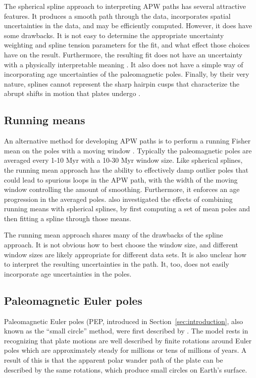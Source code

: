 \documentclass[preprint,12pt,authoryear]{elsarticle}
\begin{document}
The spherical spline approach to interpreting APW paths has several attractive features.
It produces a smooth path through the data, incorporates spatial uncertainties
in the data, and may be efficiently computed.
However, it does have some drawbacks.
It is not easy to determine the appropriate uncertainty weighting and spline
tension parameters for the fit, and what effect those choices have on the result.
Furthermore, the resulting fit does not have an uncertainty with a physically
interpretable meaning \citep{torsvik1996continental}.
It also does not have a simple way of incorporating age uncertainties of the paleomagnetic poles.
Finally, by their very nature, splines cannot represent the sharp hairpin cusps
that characterize the abrupt shifts in motion that plates undergo \citep{irving1972hairpins, gordon1984paleomagnetic}.

\subsection{Running means}

An alternative method for developing APW paths is to perform a running Fisher
mean on the poles with a moving window \citep{van2001evidence, torsvik2008global}.
Typically the paleomagnetic poles are averaged every 1-10 Myr with a 10-30 Myr
window size. Like spherical splines, the running mean approach has the ability
to effectively damp outlier poles that could lead to spurious loops in the APW path, with the width
of the moving window controlling the amount of smoothing.
Furthermore, it enforces an age progression in the averaged poles.
\citet{torsvik2008global} also investigated the effects of combining running means
with spherical splines, by first computing a set of mean poles and then
fitting a spline through those means.

The running mean approach shares many of the drawbacks of the spline approach. 
It is not obvious how to best choose the window size, and different window sizes are
likely appropriate for different data sets. 
It is also unclear how to interpret the resulting uncertainties in the path.
It, too, does not easily incorporate age uncertainties in the poles.

\subsection{Paleomagnetic Euler poles}

Paleomagnetic Euler poles (PEP, introduced in Section~\ref{sec:introduction}, 
also known as the ``small circle'' method, were first described by \citet{gordon1984paleomagnetic}.
The model rests in recognizing that plate motions are well described by finite
rotations around Euler poles which are approximately steady for millions or 
tens of millions of years. A result of this is that the apparent polar
wander path of the plate can be described by the same rotations, which
produce small circles on Earth's surface.
\end{document}
